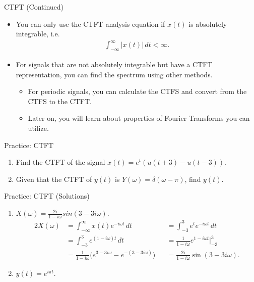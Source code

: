 \begin{frame}{CTFT (Continued)}
    \begin{itemize}
        \item You can only use the CTFT analysis equation if $x(t)$ is absolutely integrable, i.e.
        \begin{align*}
            \int_{-\infty}^\infty |x(t)| \, dt < \infty.
        \end{align*}
        \item For signals that are not absolutely integrable but have a CTFT representation, you can find the spectrum using other methods.
        \begin{itemize}
            \item For periodic signals, you can calculate the CTFS and convert from the CTFS to the CTFT.
            \item Later on, you will learn about properties of Fourier Transforms you can utilize.
        \end{itemize}
    \end{itemize}
\end{frame}

\begin{frame}{Practice: CTFT}
    \begin{enumerate}
        \item Find the CTFT of the signal
        $x(t) = e^{t} (u(t + 3) - u(t - 3)).$
        \item Given that the CTFT of $y(t)$ is $Y(\omega) = \delta(\omega - \pi)$, find $y(t)$. 
    \end{enumerate}
\end{frame}

\begin{frame}{Practice: CTFT (Solutions)}
    \begin{enumerate}
        \item {\color{red} $X(\omega) = \frac{2i}{1 - i\omega} sin(3 - 3i\omega).$}
        {\color{blue}
        \begin{alignat*}{2}
            X(\omega) &= \int_{-\infty}^\infty x(t) e^{-i\omega t}\, dt
            &&= \int_{-3}^3 e^{t}e^{-i\omega t}\, dt \\
            &= \int_{-3}^3 e^{(1 - i\omega)t}\,dt 
            &&= \frac{1}{1 - i\omega} e^{1 - i\omega t} \bigg\rvert_{-3}^3  \\
            &= \frac{1}{1 - i\omega} \big(e^{3 - 3i\omega} - e^{-(3 - 3i\omega)}\big)
            &&= \frac{2i}{1 - i\omega} \sin(3 - 3i\omega).
        \end{alignat*}
        }
        \item {\color{red} $y(t) = e^{i\pi t}.$}
    \end{enumerate}
\end{frame}

